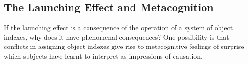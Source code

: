 \documentclass[12pt]{extarticle}
\begin{document}
\begin{multicols*}{3}
\section{The Launching Effect and Metacognition}
If the launching effect is a consequence of the operation
of a system of object indexes, why does it have phenomenal consequences?
One possibility is that conflicts in assigning object indexes give rise to metacognitive feelings
of surprise 
which subjects have learnt to interpret as impressions of causation.



\footnotesize


\end{multicols*}
\end{document}
